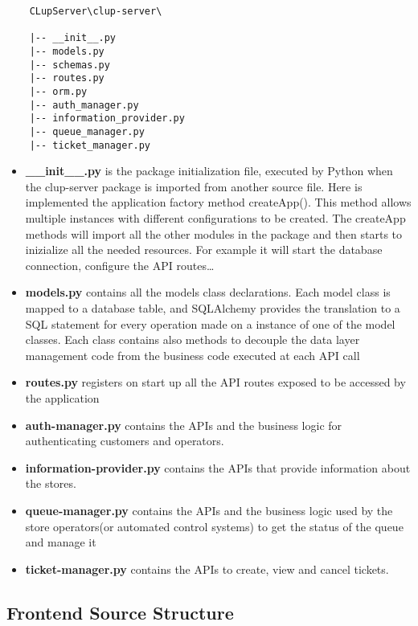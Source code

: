 \begin{lstlisting}
    CLupServer\clup-server\

    |-- __init__.py
    |-- models.py
    |-- schemas.py
    |-- routes.py
    |-- orm.py
    |-- auth_manager.py
    |-- information_provider.py
    |-- queue_manager.py
    |-- ticket_manager.py

\end{lstlisting}

\begin{itemize}
    \item \textbf{\_\_init\_\_.py} is the package initialization file, executed by Python when the clup-server package is imported from another source file. Here is implemented the application factory method createApp(). This method allows multiple instances with different configurations to be created. The createApp methods will import all the other modules in the package and then starts to inizialize all the needed resources. For example it will start the database connection, configure the API routes\ldots
    \item \textbf{models.py} contains all the models class declarations. Each model class is mapped to a database table, and SQLAlchemy provides the translation to a SQL statement for every operation made on a instance of one of the model classes. Each class contains also methods to decouple the data layer management code from the business code executed at each API call
    \item \textbf{routes.py} registers on start up all the API routes exposed to be accessed by the application
    \item \textbf{auth-manager.py} contains the APIs and the business logic for authenticating customers and operators.
    \item \textbf{information-provider.py} contains the APIs that provide information about the stores.
    \item \textbf{queue-manager.py} contains the APIs and the business logic used by the store operators(or automated control systems) to get the status of the queue and manage it
    \item \textbf{ticket-manager.py} contains the APIs to create, view and cancel tickets.
\end{itemize}


\subsection{Frontend Source Structure}

